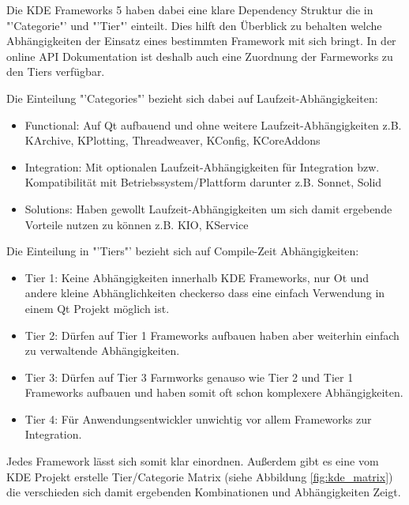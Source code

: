 Die KDE Frameworks 5 haben dabei eine klare Dependency Struktur die in "'Categorie"' und "'Tier"' einteilt. Dies hilft den Überblick zu behalten welche Abhängigkeiten der Einsatz eines bestimmten Framework mit sich bringt. In der online API Dokumentation ist deshalb auch eine Zuordnung der Farmeworks zu den Tiers verfügbar.

Die Einteilung "'Categories"' bezieht sich dabei auf Laufzeit-Abhängigkeiten:
\begin{itemize}
\setlength\itemsep{0em}
\item Functional: Auf Qt aufbauend und ohne weitere Laufzeit-Abhängigkeiten z.B. KArchive, KPlotting, Threadweaver, KConfig, KCoreAddons

\item Integration: Mit optionalen Laufzeit-Abhängigkeiten für Integration bzw. Kompatibilität mit Betriebssystem/Plattform darunter z.B. Sonnet, Solid

\item Solutions: Haben gewollt Laufzeit-Abhängigkeiten um sich damit ergebende Vorteile nutzen zu können z.B. KIO, KService
\end{itemize}

Die Einteilung in "'Tiers"' bezieht sich auf Compile-Zeit Abhängigkeiten:
\begin{itemize}
\setlength\itemsep{0em}
\item Tier 1: Keine Abhängigkeiten innerhalb KDE Frameworks, nur Ot und andere kleine Abhänglichkeiten  checkerso dass eine einfach Verwendung in einem Qt Projekt möglich ist. 

\item Tier 2: Dürfen auf Tier 1 Frameworks aufbauen haben aber weiterhin einfach zu verwaltende Abhängigkeiten.

\item Tier 3: Dürfen auf Tier 3 Farmworks genauso wie Tier 2 und Tier 1 Frameworks aufbauen und haben somit oft schon komplexere Abhängigkeiten.

\item Tier 4: Für Anwendungsentwickler unwichtig vor allem Frameworks zur Integration. 
\end{itemize}

Jedes Framework lässt sich somit klar einordnen. Außerdem gibt es eine vom KDE Projekt erstelle Tier/Categorie Matrix (siehe Abbildung \ref{fig:kde_matrix}) die verschieden sich damit ergebenden Kombinationen und Abhängigkeiten Zeigt.

